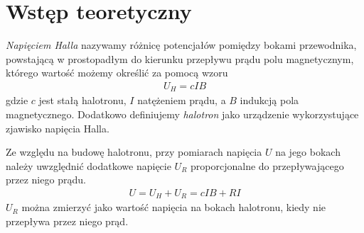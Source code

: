\documentclass{article}
\begin{document}
\section{Wstęp teoretyczny}

\emph{Napięciem Halla} nazywamy różnicę potencjałów pomiędzy bokami
przewodnika, powstającą w prostopadłym do kierunku przepływu prądu
polu magnetycznym, którego wartość możemy określić za pomocą wzoru
\begin{align}
    U_H = cIB
\end{align}
gdzie $c$ jest stałą halotronu, $I$ natężeniem prądu,
a $B$ indukcją pola magnetycznego.
Dodatkowo definiujemy \emph{halotron} jako urządzenie
wykorzystujące zjawisko napięcia Halla.

Ze względu na budowę halotronu, przy pomiarach napięcia $U$ na jego 
bokach
należy uwzględnić dodatkowe napięcie $U_R$ proporcjonalne do
przepływającego przez niego prądu.
\begin{align}
    U = U_H + U_R = cIB + RI
    \label{eq:Ugen}
\end{align}
$U_R$ można zmierzyć jako wartość napięcia na bokach halotronu, kiedy
nie przepływa przez niego prąd.
\end{document}

